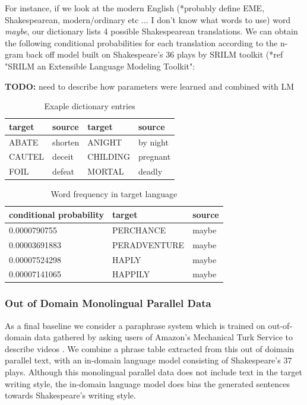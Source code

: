 \documentclass[10pt,a5paper,twoside]{article}
\begin{document}
For instance, if we look at the modern English (*probably define EME, Shakespearean, modern/ordinary etc ... I don't know what words to use) word \emph{maybe}, our dictionary lists 4 possible Shakespearean translations. We can obtain the following conditional probabilities for each translation according to the n-gram back off model built on Shakespeare's 36 plays by SRILM toolkit (*ref "SRILM an Extensible Language Modeling Toolkit":

{\bf TODO:} need to describe how parameters were learned and combined with LM

\begin{table}
  \begin{center}
  \begin{tabular}{|l|l||l|l|}
    \hline
    target & source & target & source \\
    \hline
    \hline
    ABATE & shorten & ANIGHT & by night \\
    \hline
    CAUTEL & deceit & CHILDING & pregnant \\
    \hline
    FOIL & defeat & MORTAL & deadly \\
    \hline
  \end{tabular}
  \end{center}
  \caption{Exaple dictionary entries}
  \label{dictionary_example}
\end{table}

\begin{table}
  \begin{center}
  \begin{tabular}{|l|l|l|}
    \hline
    conditional probability & target & source \\
    \hline
    \hline
    0.0000790755 & PERCHANCE & maybe \\
    \hline
    0.00003691883 & PERADVENTURE & maybe \\
    \hline
    0.00007524298 & HAPLY & maybe \\
    \hline
    0.00007141065 & HAPPILY & maybe \\
    \hline
  \end{tabular}
  \end{center}
  \caption{Word frequency in target language}
  \label{word_frequency}
\end{table}

\subsubsection{Out of Domain Monolingual Parallel Data}
As a final baseline we consider a paraphrase system which is trained on out-of-domain data gathered by asking users of Amazon's Mechanical Turk Service 
\cite{Snow08} to describe videos \cite{chen11}.  We combine a phrase table extracted from this out of doimain parallel text, with an in-domain
language model consisting of Shakespeare's 37 plays.  Although this monolingual parallel data does not include text in the target writing style,
the in-domain language model does bias the generated sentences towards Shakespeare's writing style.
\end{document}
